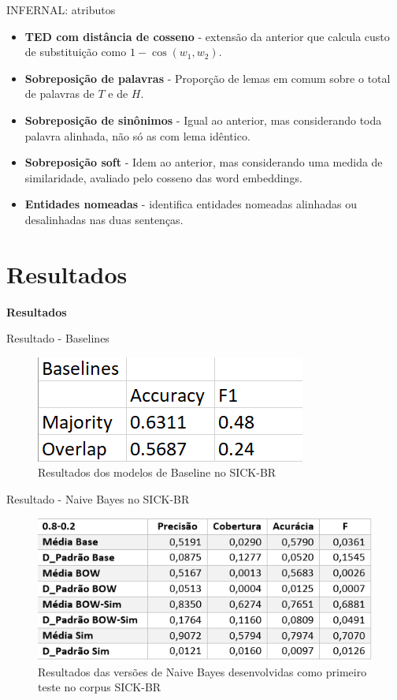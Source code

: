 \documentclass{beamer}
\begin{document}
\begin{frame}[fragile]{INFERNAL: atributos}
\begin{itemize}
\item \textbf{TED com distância de cosseno} - extensão da anterior que calcula custo de substituição como $1-\cos(w_1,w_2)$.
\item \textbf{Sobreposição de palavras} -  Proporção de lemas em comum sobre o total de palavras de $T$ e de $H$.
\item \textbf{Sobreposição de sinônimos} -  Igual ao anterior, mas considerando toda palavra alinhada, não só as com lema idêntico.
\item \textbf{Sobreposição soft} - Idem ao anterior, mas considerando uma medida de similaridade, avaliado pelo cosseno das word embeddings.
\item \textbf{Entidades nomeadas} - identifica entidades nomeadas alinhadas ou desalinhadas nas duas sentenças. 
\end{itemize}
\end{frame}



\section{Resultados}
	\begin{frame}[fragile]
\centering \textbf{Resultados\\}
\end{frame}


\begin{frame}{Resultado - Baselines}
\begin{figure}
	\centering
	\includegraphics[width=0.7\linewidth]{resultados-baseline}
	\caption{Resultados dos modelos de Baseline no SICK-BR}
	\label{fig:resultados-baseline}
\end{figure}

\end{frame}

\begin{frame}[fragile]{Resultado - Naive Bayes no SICK-BR}
	\begin{figure}
		\centering
		\includegraphics[width=0.7\linewidth]{nb-sickbr}
		\caption{Resultados das versões de Naive Bayes desenvolvidas como primeiro teste no corpus SICK-BR}
		\label{fig:nb-sickbr}
	\end{figure}
	
\end{frame}
\end{document}
